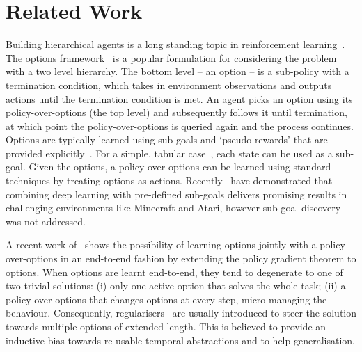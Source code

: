 
\section{Related Work}
\label{sec:related_work}
\seckiny

Building hierarchical agents is a long standing topic in reinforcement learning~\cite{sutton1999between,precup2000temporal, dayan1993feudal, dietterich2000hierarchical, boutilier1997prioritized, dayan1993improving, kaelbling2014hierarchical, parr1998reinforcement, precup1997planning, precup1998theoretical, schmidhuber1991neural, sutton1995td, wiering1997hq,vezhnevets2016straw,bacon2015option}. 
The options framework~\cite{sutton1999between,precup2000temporal} is a popular formulation for considering the problem with a two level hierarchy. The bottom level -- an option -- is a sub-policy with a termination condition, which takes in environment observations and outputs actions until the termination condition is met. 
An agent picks an option using its policy-over-options (the top level) and subsequently follows it until termination, at which point the policy-over-options is queried again and the process continues. 
Options are typically learned using sub-goals and `pseudo-rewards' that are provided explicitly~\cite{sutton1999between, dietterich2000hierarchical, dayan1993feudal}. For a simple, tabular case~\cite{wiering1997hq,schaul2015uvfa}, each state can be used as a sub-goal.
Given the options, a policy-over-options can be learned using standard techniques by treating options as actions. 
Recently~\cite{tessler2016minecraft, tejas2016hdrl} have demonstrated that combining deep learning with pre-defined sub-goals delivers promising results in challenging environments like Minecraft and Atari, however sub-goal discovery was not addressed.

A recent work of~\cite{bacon2015option} shows the possibility of learning options jointly with a policy-over-options in an end-to-end fashion by extending the policy gradient theorem to options. 
When options are learnt end-to-end, they tend to degenerate to one of two trivial solutions: (i) only one active option that solves the whole task; (ii) a policy-over-options that changes options at every step, micro-managing the behaviour. Consequently, regularisers~\cite{bacon2015option,vezhnevets2016straw} are usually introduced to steer the solution towards multiple options of extended length. This is believed to provide an inductive bias towards re-usable temporal abstractions and to help generalisation. 

